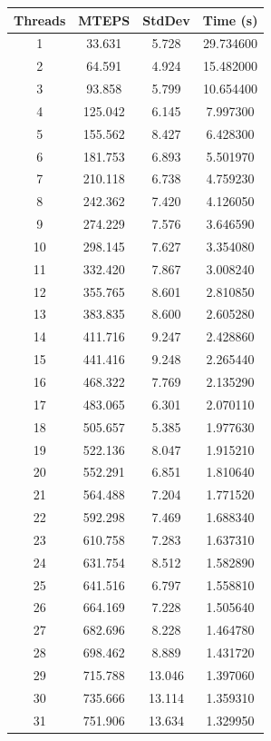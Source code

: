 \documentclass[10pt,twocolumn,letterpaper]{article}
\begin{document}
\begin{table}[h]
\renewcommand\arraystretch{0.8}
\centering
\begin{tabular}{@{}c|ccc@{}}
\toprule
Threads          & MTEPS  & StdDev     & Time (s)      \\ \midrule
1 & 33.631 & 5.728 & 29.734600 \\
2 & 64.591 & 4.924 & 15.482000 \\
3 & 93.858 & 5.799 & 10.654400 \\
4 & 125.042 & 6.145 & 7.997300 \\
5 & 155.562 & 8.427 & 6.428300 \\
6 & 181.753 & 6.893 & 5.501970 \\
7 & 210.118 & 6.738 & 4.759230 \\
8 & 242.362 & 7.420 & 4.126050 \\
9 & 274.229 & 7.576 & 3.646590 \\
10 & 298.145 & 7.627 & 3.354080 \\
11 & 332.420 & 7.867 & 3.008240 \\
12 & 355.765 & 8.601 & 2.810850 \\
13 & 383.835 & 8.600 & 2.605280 \\
14 & 411.716 & 9.247 & 2.428860 \\
15 & 441.416 & 9.248 & 2.265440 \\
16 & 468.322 & 7.769 & 2.135290 \\
17 & 483.065 & 6.301 & 2.070110 \\
18 & 505.657 & 5.385 & 1.977630 \\
19 & 522.136 & 8.047 & 1.915210 \\
20 & 552.291 & 6.851 & 1.810640 \\
21 & 564.488 & 7.204 & 1.771520 \\
22 & 592.298 & 7.469 & 1.688340 \\
23 & 610.758 & 7.283 & 1.637310 \\
24 & 631.754 & 8.512 & 1.582890 \\
25 & 641.516 & 6.797 & 1.558810 \\
26 & 664.169 & 7.228 & 1.505640 \\
27 & 682.696 & 8.228 & 1.464780 \\
28 & 698.462 & 8.889 & 1.431720 \\
29 & 715.788 & 13.046 & 1.397060 \\
30 & 735.666 & 13.114 & 1.359310 \\
31 & 751.906 & 13.634 & 1.329950 \\

\end{tabular}
\end{table}
\end{document}
